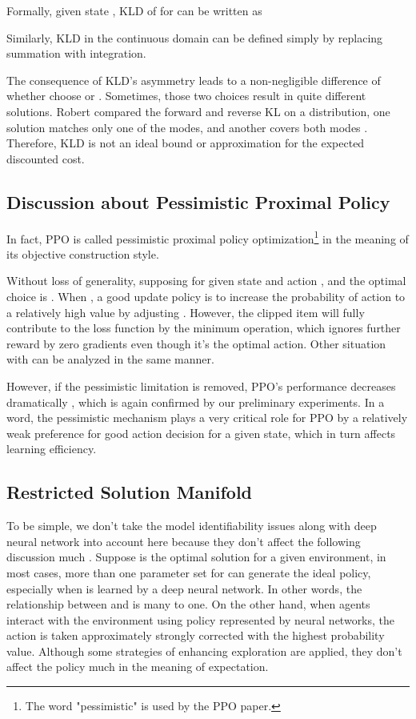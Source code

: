 \documentclass{article}
\begin{document}
Formally, given state , KLD of   for    can be written as


Similarly, KLD in the continuous domain can be defined simply by replacing summation with integration.

The consequence of KLD's asymmetry leads to a non-negligible difference of whether choose  or . Sometimes, those two choices result in quite different solutions. Robert compared the forward and reverse KL on a distribution, one solution matches only one of the modes, and another covers both modes \cite{robert2014machine}. Therefore, KLD is not an ideal bound or approximation for the expected discounted cost. 

\subsection{Discussion about Pessimistic Proximal Policy}
In fact, PPO is called pessimistic proximal policy optimization\footnote{The word "pessimistic" is  used by the PPO paper.} in the meaning of its objective construction style.



Without loss of generality, supposing   for given state  and action , and the optimal choice is . When , a good update policy  is to increase the probability of action to a relatively high value  by adjusting . However, the clipped item  will fully contribute to the loss function by the minimum operation, which ignores further reward by zero gradients even though it's the optimal action. Other situation with  can be analyzed in the same manner.

However, if the pessimistic limitation is removed, PPO's performance decreases dramatically \cite{2017arXiv170706347S}, which is again confirmed by our preliminary experiments. In a word, the pessimistic mechanism plays a very critical role for PPO by a relatively weak preference for good action decision for a given state, which in turn affects learning efficiency.

\subsection{Restricted Solution Manifold}
To be simple, we don't take the model identifiability issues along with deep neural network into account here because they don't affect the following discussion much \cite{goodfellow2016deep}. Suppose  is the optimal solution for a given environment, in most cases, more than one parameter set for  can generate the ideal policy, especially when  is learned by a deep neural network. In other words, the relationship between  and  is many to one. On the other hand, when agents interact with the environment using policy represented by neural networks, the action is taken approximately strongly corrected with the highest probability value. Although some strategies of enhancing exploration are applied, they don't affect the policy much in the meaning of expectation. 
\end{document}
